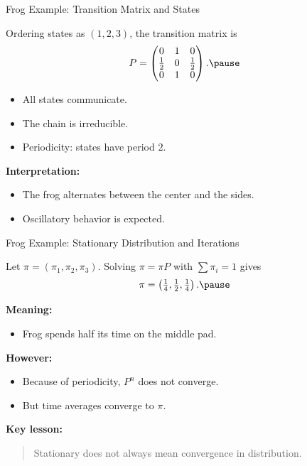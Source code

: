 \documentclass[aspectratio=169]{beamer}
\begin{document}
\begin{frame}{Frog Example: Transition Matrix and States}

Ordering states as $(1,2,3)$, the transition matrix is
\[
P=
\begin{pmatrix}
0 & 1 & 0\\
\frac12 & 0 & \frac12\\
0 & 1 & 0
\end{pmatrix}.\pause
\]

\begin{itemize}
  \item All states communicate.\pause
  \item The chain is irreducible.\pause
  \item Periodicity: states have period $2$.\pause
\end{itemize}

\medskip
\textbf{Interpretation:}
\begin{itemize}
  \item The frog alternates between the center and the sides.\pause
  \item Oscillatory behavior is expected.\pause
\end{itemize}

\end{frame}

\begin{frame}{Frog Example: Stationary Distribution and Iterations}

Let $\pi=(\pi_1,\pi_2,\pi_3)$.
Solving $\pi=\pi P$ with $\sum \pi_i=1$ gives
\[
\pi=\left(\tfrac14,\tfrac12,\tfrac14\right).\pause
\]

\medskip
\textbf{Meaning:}
\begin{itemize}
  \item Frog spends half its time on the middle pad.\pause
\end{itemize}

\medskip
\textbf{However:}
\begin{itemize}
  \item Because of periodicity, $P^n$ does not converge.\pause
  \item But time averages converge to $\pi$.\pause
\end{itemize}

\medskip
\textbf{Key lesson:}
\begin{quote}
Stationary does not always mean convergence in distribution.\pause
\end{quote}

\end{frame}
\end{document}
